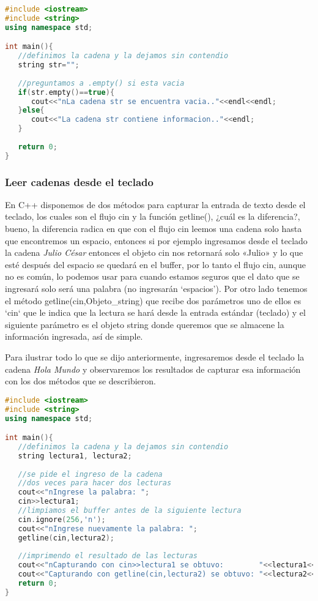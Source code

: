 \begin{lstlisting}[language=C++]
#include <iostream>
#include <string>
using namespace std;

int main(){
   //definimos la cadena y la dejamos sin contendio
   string str="";
	
   //preguntamos a .empty() si esta vacia
   if(str.empty()==true){
      cout<<"nLa cadena str se encuentra vacia.."<<endl<<endl;
   }else{
      cout<<"La cadena str contiene informacion.."<<endl;
   }
	
   return 0;
}
\end{lstlisting}

\subsubsection{Leer cadenas desde el teclado}

En C++ disponemos de dos métodos para capturar la entrada de texto desde el teclado, los cuales son el flujo cin y la función getline(), ¿cuál es la diferencia?, bueno, la diferencia radica en que con el flujo cin leemos una cadena solo hasta que encontremos un espacio, entonces si por ejemplo ingresamos desde el teclado la cadena \emph{Julio César} entonces el objeto cin nos retornará solo «Julio»  y lo que esté después del espacio se quedará en el buffer, por lo tanto el flujo cin, aunque no es común, lo podemos usar para cuando estamos seguros que el dato que se ingresará solo será una palabra (no ingresarán ‘espacios’). Por otro lado tenemos el método getline(cin,Objeto\_string) que recibe dos parámetros uno de ellos es ‘cin‘ que le indica que la lectura se hará desde la entrada estándar (teclado) y el siguiente parámetro es el objeto string donde queremos que se almacene la información ingresada, así de simple.

Para ilustrar todo lo que se dijo anteriormente, ingresaremos desde el teclado la cadena \emph{Hola Mundo} y observaremos los resultados de capturar esa información con los dos métodos que se describieron.

\begin{lstlisting}[language=C++]
#include <iostream>
#include <string>
using namespace std;

int main(){
   //definimos la cadena y la dejamos sin contendio
   string lectura1, lectura2;
	
   //se pide el ingreso de la cadena
   //dos veces para hacer dos lecturas
   cout<<"nIngrese la palabra: ";
   cin>>lectura1;
   //limpiamos el buffer antes de la siguiente lectura
   cin.ignore(256,'n');
   cout<<"nIngrese nuevamente la palabra: ";
   getline(cin,lectura2);
	
   //imprimendo el resultado de las lecturas
   cout<<"nCapturando con cin>>lectura1 se obtuvo:        "<<lectura1<<endl<<endl;
   cout<<"Capturando con getline(cin,lectura2) se obtuvo: "<<lectura2<<endl<<endl;
   return 0;
}
\end{lstlisting}

